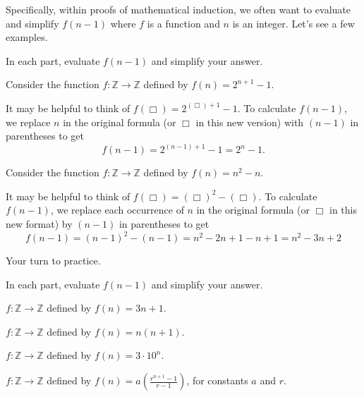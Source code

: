 Specifically, within proofs of mathematical induction, we often want to evaluate and simplify $f(n-1)$ where $f$ is a function and $n$ is an integer.  Let's see a few examples.

\begin{exam}[Evaluating $f(n-1)$]
\label{exam_eval_fofnminus1}
    In each part, evaluate $f(n-1)$ and simplify your answer.
        \begin{apart}            
            \item Consider the function $f: \mathbb{Z} \to \mathbb{Z}$ defined by $f(n)=2^{n+1}-1$.
                \begin{soln}
                    It may be helpful to think of $f(\Box) = 2^{(\Box)+1} -1$. To calculate $f(n-1)$, we replace $n$ in the original formula (or $\Box$ in this new version) with $(n-1)$ in parentheses to get
                    $$f(n-1) = 2^{(n-1)+1}-1=2^n-1.$$
                \end{soln}
            \item Consider the function $f: \mathbb{Z} \to \mathbb{Z}$ defined by $f(n)=n^2-n$.
                \begin{soln}
                    It may be helpful to think of $f(\Box) = (\Box)^2-(\Box).$ To calculate $f(n-1)$, we replace each occurrence of $n$ in the original formula (or $\Box$ in this new format) by $(n-1)$ in parentheses to get
                    $$f(n-1) = (n-1)^2-(n-1) = n^2-2n+1-n+1=n^2-3n+2$$
                \end{soln}
        \end{apart}
\end{exam}

Your turn to practice.

\begin{act}[Evaluating $f(n-1)$]
\label{act_eval_fofnminus1}  
    In each part, evaluate $f(n-1)$ and simplify your answer.
        \begin{actpart}
            \item $f: \mathbb{Z} \to \mathbb{Z}$ defined by $f(n)=3n+1$.
            \item $f: \mathbb{Z} \to \mathbb{Z}$ defined by $f(n)=n(n+1)$.
            \item $f: \mathbb{Z} \to \mathbb{Z}$ defined by $f(n)=3 \cdot 10^n$.
            \item $f: \mathbb{Z} \to \mathbb{Z}$ defined by $\displaystyle f(n)=a \left(\frac{r^{n+1}-1}{r-1}\right)$, for constants $a$ and $r$.
        \end{actpart}
\end{act}

